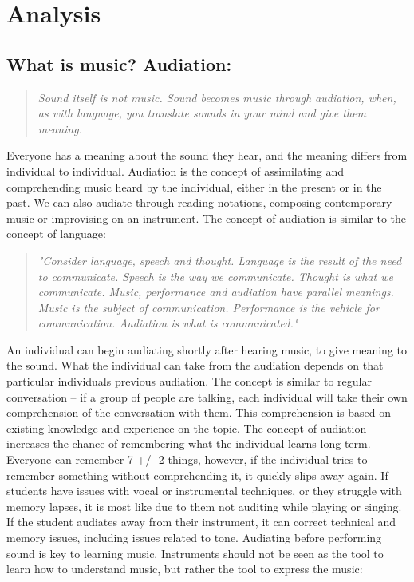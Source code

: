 \chapter{Analysis}
\section{What is music? Audiation:} 
\begin{quote}
	\textit{Sound itself is not music. Sound becomes music through audiation, when, as with language, you translate sounds in your mind and give them meaning.}\\
\end{quote}

Everyone has a meaning about the sound they hear, and the meaning differs from individual to individual. Audiation is the concept of assimilating and comprehending music heard by the individual, either in the present or in the past. We can also audiate through reading notations, composing contemporary music or improvising on an instrument.
The concept of audiation is similar to the concept of language:\\

\begin{quote}
	\textit{"Consider language, speech and thought. Language is the result of the need to communicate. Speech is the way we communicate. Thought is what we communicate. Music, performance and audiation have parallel meanings. Music is the subject of communication. Performance is the vehicle for communication. Audiation is what is communicated."}\\
\end{quote}

An individual can begin audiating shortly after hearing music, to give meaning to the sound. What the individual can take from the audiation depends on that particular individuals previous audiation. The concept is similar to regular conversation – if a group of people are talking, each individual will take their own comprehension of the conversation with them. This comprehension is based on existing knowledge and experience on the topic. 
The concept of audiation increases the chance of remembering what the individual learns long term. Everyone can remember 7 +/- 2 things, however, if the individual tries to remember something without comprehending it, it quickly slips away again. If students have issues with vocal or instrumental techniques, or they struggle with memory lapses, it is most like due to them not auditing while playing or singing. If the student audiates away from their instrument, it can correct technical and memory issues, including issues related to tone. Audiating before performing sound is key to learning music. Instruments should not be seen as the tool to learn how to understand music, but rather the tool to express the music:\\

